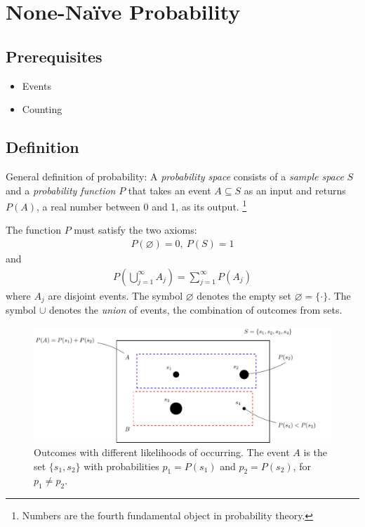 


\maketitle
\clearpage

\section{None-Naïve Probability}

\subsection{Prerequisites}

\begin{itemize}
\item Events
\item Counting
\end{itemize}

\subsection{Definition}

General definition of probability: 
A \emph{probability space} consists of a \emph{sample space} \(S\) 
and a \emph{probability function} \(P\) 
that takes an event \(A \subseteq S\) as an input and returns \(P(A)\), 
a real number between 0 and 1, as its output.%
\footnote{Numbers are the fourth fundamental object in probability theory.} 

The function \(P\) must satisfy the two axioms:
\begin{align}
P(\varnothing) = 0,\ P(S) = 1
\end{align}
and
\begin{align}
P\left( \bigcup_{j = 1}^{\infty}A_{j} \right) = \sum_{j = 1}^{\infty}{P(A_{j})}
\end{align}
where \(A_{j}\) are disjoint events.
The symbol \(\varnothing\) denotes the empty set \(\varnothing=\{\cdot\}\). 
The symbol \(\cup\) denotes the \emph{union} of events, 
the combination of outcomes from sets.

\begin{figure}[h!]
\centering
\includegraphics[width=0.9\linewidth]{tikz/figure1}
\caption{%
Outcomes with different likelihoods of occurring.
The event \(A\) is the set \(\{s_1, s_2\}\) with probabilities \(p_1=P(s_1)\) and
\(p_2=P(s_2)\),
for \(p_1 \neq p_2\).
}
\label{fig:outcomes}
\end{figure}

